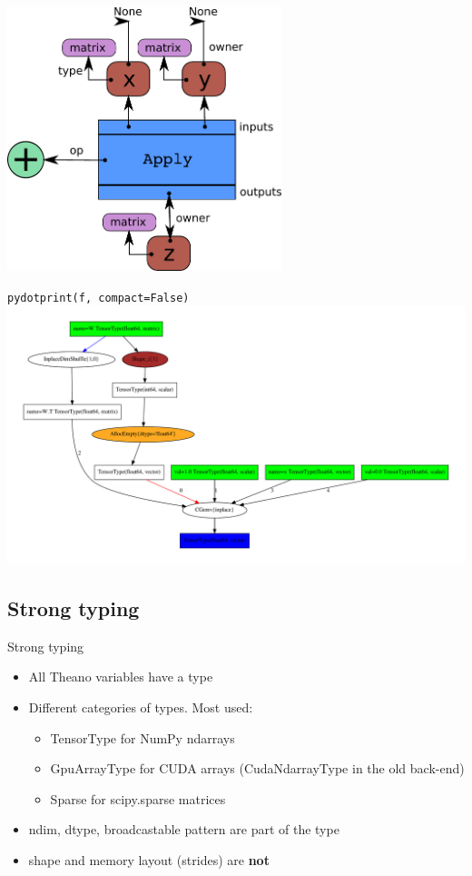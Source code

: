 \documentclass[a4paper,9pt]{beamer}
\begin{document}
\begin{frame}
  \center
  \includegraphics[width=0.6\textwidth]{apply.pdf}
\end{frame}

\begin{frame}{\tt pydotprint(f, compact=False)}
    \includegraphics[width=\textwidth]{pydotprint_f_notcompact.pdf}
\end{frame}

\subsection{Strong typing}
\begin{frame}{Strong typing}
  \begin{itemize}
    \item All Theano variables have a type
    \item Different categories of types. Most used:
      \begin{itemize}
        \item TensorType for NumPy ndarrays
        \item GpuArrayType for CUDA arrays (CudaNdarrayType in the old back-end)
        \item Sparse for scipy.sparse matrices
      \end{itemize}
    \item ndim, dtype, broadcastable pattern are part of the type
    \item shape and memory layout (strides) are {\bf not}
  \end{itemize}
\end{frame}
\end{document}
